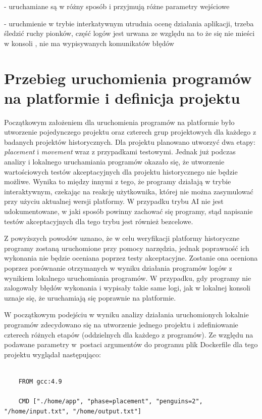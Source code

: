 - uruchamiane są w różny sposób i przyjmują różne parametry wejściowe

- uruchmienie w trybie interkatywnym utrudnia ocenę działania aplikacji, trzeba śledzić ruchy pionków, część logów jest urwana ze względu na to że się nie mieści w konsoli
, nie ma wypisywanych komunikatów błędów

\section{Przebieg uruchomienia programów na platformie i definicja projektu}

Początkowym założeniem dla uruchomienia programów na platformie było utworzenie pojedynczego projektu oraz czterech grup projektowych dla każdego z badanych projektów historycznych.
Dla projektu planowano utworzyć dwa etapy: \textit{placement} i \textit{movement} wraz z przypadkami testowymi.
Jednak już podczas analizy i lokalnego uruchamiania programów okazało się, że utworzenie wartościowych testów akceptacyjnych dla projektu historycznego nie będzie możliwe.
Wynika to między innymi z tego, że programy działają w trybie interaktywnym, czekając na reakcję użytkownika, której nie można zasymulować przy użyciu aktualnej wersji platformy.
W przypadku trybu AI nie jest udokumentowane, w jaki sposób powinny zachować się programy, stąd napisanie testów akceptacyjnych dla tego trybu jest również bezcelowe.

Z powyższych powodów uznano, że w celu weryfikacji platformy historyczne programy zostaną uruchomione przy pomocy narzędzia, jednak poprawność ich wykonania nie będzie oceniana poprzez testy akceptacyjne.
Zostanie ona oceniona poprzez porównanie otrzymanych w wyniku działania programów logów z wynikiem lokalnego uruchomiania programów.
W przypadku, gdy programy nie zalogowały błędów wykonania i wypisały takie same logi, jak w lokalnej konsoli uznaje się, że uruchamiają się poprawnie na platformie.

W początkowym podejściu w wyniku analizy działania uruchomionych lokalnie programów zdecydowano się na utworzenie jednego projektu i zdefiniowanie czterech różnych etapów (oddzielnych dla każdego z programów).
Ze względu na podawane parametry w~postaci argumentów do programu plik Dockerfile dla tego projektu wyglądał następująco:

{\selectfont
\tiny
\begin{lstlisting}

    FROM gcc:4.9

    CMD ["./home/app", "phase=placement", "penguins=2", "/home/input.txt", "/home/output.txt"]

\end{lstlisting}
}

